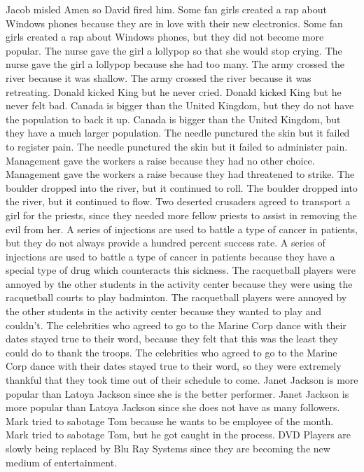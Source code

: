 \documentclass{article}
\begin{document}
\begin{enumerate}
Jacob misled Amen so David fired him.
Some fan girls created a rap about Windows phones because they are in love with their new electronics.
Some fan girls created a rap about Windows phones, but they did not become more popular.
The nurse gave the girl a lollypop so that she would stop crying.
The nurse gave the girl a lollypop because she had too many.
The army crossed the river because it was shallow.
The army crossed the river because it was retreating.
Donald kicked King but he never cried.
Donald kicked King but he never felt bad.
Canada is bigger than the United Kingdom, but they do not have the population to back it up.
Canada is bigger than the United Kingdom, but they have a much larger population.
The needle punctured the skin but it failed to register pain.
The needle punctured the skin but it failed to administer pain.
Management gave the workers a raise because they had no other choice.
Management gave the workers a raise because they had threatened to strike.
The boulder dropped into the river, but it continued to roll.
The boulder dropped into the river, but it continued to flow.
Two deserted crusaders agreed to transport a girl for the priests, since they needed more fellow priests to assist in removing the evil from her.
A series of injections are used to battle a type of cancer in patients, but they do not always provide a hundred percent success rate.
A series of injections are used to battle a type of cancer in patients because they have a special type of drug which counteracts this sickness.
The racquetball players were annoyed by the other students in the activity center because they were using the racquetball courts to play badminton.
The racquetball players were annoyed by the other students in the activity center because they wanted to play and couldn't.
The celebrities who agreed to go to the Marine Corp dance with their dates stayed true to their word, because they felt that this was the least they could do to thank the troops.
The celebrities who agreed to go to the Marine Corp dance with their dates stayed true to their word, so they were extremely thankful that they took time out of their schedule to come.
Janet Jackson is more popular than Latoya Jackson since she is the better performer.
Janet Jackson is more popular than Latoya Jackson since she does not have as many followers.
Mark tried to sabotage Tom because he wants to be employee of the month.
Mark tried to sabotage Tom, but he got caught in the process.
DVD Players are slowly being replaced by Blu Ray Systems since they are becoming the new medium of entertainment.

\end{enumerate}
\end{document}
